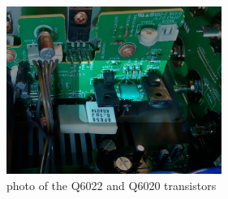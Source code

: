 \documentclass[a4paper,twoside,notitlepage]{article}
\begin{document}
\begin{figure}[hptb!]
 \centering
 \includegraphics[width=7cm, keepaspectratio=true]{img_report/power_amp_pcb_r.png}
 \caption{photo of the Q6022 and Q6020 transistors}
\end{figure}


\end{document}
